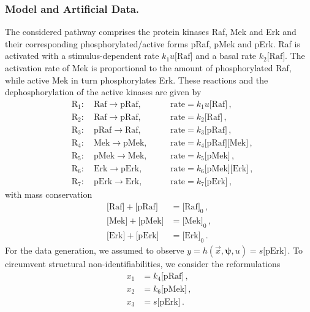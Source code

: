 \documentclass{llncs}
\newcommand{\x}{\vec{x}}
\newcommand{\vpsi}{\boldsymbol{\psi}}
\begin{document}
\subsubsection{Model and Artificial Data.}
The considered pathway comprises the protein kinases Raf, Mek and Erk and their corresponding phosphorylated/active forms pRaf, pMek and pErk. Raf is activated with a stimulus-dependent rate $k_{1}u \big[ \text{Raf}  \big]$ and a basal rate $k_2\big[ \text{Raf}  \big]$. The activation rate of Mek is proportional to the amount of phosphorylated Raf, while active Mek in turn phosphorylates Erk. These reactions and the dephosphorylation of the active kinases are given by
\begin{align*}
&\mbox{R}_{1}:\quad  \text{Raf} \to \text{pRaf} , \quad &&\mbox{rate} = k_{1}u \big[ \text{Raf}  \big]\,, \\
&\mbox{R}_{2}:\quad  \text{Raf} \to \text{pRaf} , \quad &&\mbox{rate} = k_{2} \big[ \text{Raf}  \big]\,, \\
&\mbox{R}_{3}:\quad  \text{pRaf} \to \text{Raf} , \quad &&\mbox{rate} = k_{3} \big[ \text{pRaf}  \big]\,, \\
&\mbox{R}_{4}:\quad  \text{Mek} \to \text{pMek} , \quad &&\mbox{rate} = k_{4} \big[ \text{pRaf}  \big]\big[ \text{Mek}  \big]\,,\\
&\mbox{R}_{5}: \quad \text{pMek} \to \text{Mek},  \quad &&\mbox{rate} = k_{5} \big[ \text{pMek}   \big]\,,\\
&\mbox{R}_{6}:\quad  \text{Erk} \to \text{pErk} , \quad &&\mbox{rate} = k_{6}  \big[ \text{pMek}  \big]\big[ \text{Erk}  \big]\,,\\
&\mbox{R}_{7}: \quad \text{pErk} \to \text{Erk},  \quad &&\mbox{rate} = k_{7} \big[ \text{pErk}   \big]\,,
\end{align*}
with mass conservation
\begin{align*}
\big[ \text{Raf}  \big]+\big[ \text{pRaf}  \big] &= \big[ \text{Raf}  \big]_0\,,\\
\big[ \text{Mek}  \big]+\big[ \text{pMek}  \big] &= \big[ \text{Mek}  \big]_0\,,\\
\big[ \text{Erk}  \big]+\big[ \text{pErk}  \big] &= \big[ \text{Erk}  \big]_0\,.
\end{align*}
For the data generation, we assumed to observe $y = h(\x,\vpsi,u) = s \big[ \text{pErk}  \big]\,.$ To circumvent structural non-identifiabilities, we consider the reformulations
\begin{align*}
x_1 &= k_4\big[ \text{pRaf}  \big]\,,\\
x_2 &= k_6\big[ \text{pMek}  \big]\,,\\
x_3 &= s\big[ \text{pErk}  \big]\,.
\end{align*}
\end{document}
